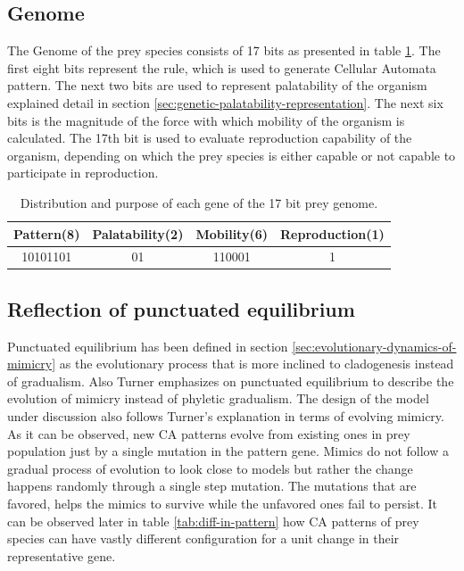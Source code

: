 \subsection{Genome}
The Genome of the prey species consists of 17 bits as presented in table \ref{tab:prey-genome}. The first eight bits represent the rule, which is used to generate Cellular Automata pattern. The next two bits are used to represent palatability of the organism explained detail in section \ref{sec:genetic-palatability-representation}. The next six bits is the magnitude of the force with which mobility of the organism is calculated. The 17th bit is used to evaluate reproduction capability of the organism, depending on which the prey species is either capable or not capable to participate in reproduction.

\begin{table}[H]
\centering
\begin{tabular}{|c|c|c|c|}
	\hline
		\textbf{Pattern(8)} & \textbf{Palatability(2)} & \textbf{Mobility(6)} & \textbf{Reproduction(1)} \\ \hline
		10101101					 	& 							01		 		 & 			110001					&					1						 		 \\ \hline
\end{tabular}
\caption{Distribution and purpose of each gene of the 17 bit prey genome.}
\label{tab:prey-genome}
\end{table}

\subsection{Reflection of punctuated equilibrium}
\label{subsec:reflection-of-punctuated-equilibrium}
Punctuated equilibrium has been defined in section \ref{sec:evolutionary-dynamics-of-mimicry} as the evolutionary process that is more inclined to cladogenesis instead of gradualism. Also Turner \cite{turner1988} emphasizes on punctuated equilibrium to describe the evolution of mimicry instead of phyletic gradualism. The design of the model under discussion also follows Turner's explanation in terms of evolving mimicry. As it can be observed, new CA patterns evolve from existing ones in prey population just by a single mutation in the pattern gene. Mimics do not follow a gradual process of evolution to look close to models but rather the change happens randomly through a single step mutation. The mutations that are favored, helps the mimics to survive while the unfavored ones fail to persist. It can be observed later in table \ref{tab:diff-in-pattern} how CA patterns of prey species can have vastly different configuration for a unit change in their representative gene. 

